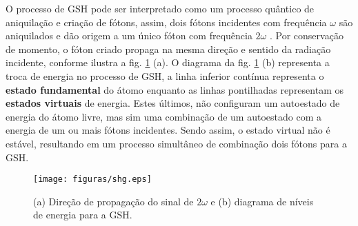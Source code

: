 O processo de GSH pode ser interpretado como um processo quântico de aniquilação e criação de fótons, assim, dois fótons incidentes com frequência $\omega$ são aniquilados e dão origem a um único fóton com frequência $2\omega$ \cite{boyd,zayats}. Por conservação de momento, o fóton criado propaga na mesma direção e sentido da radiação incidente, conforme ilustra a fig. \ref{fig:shg} (a). O diagrama da fig. \ref{fig:shg} (b) representa a troca de energia no processo de GSH, a linha inferior contínua representa o \textbf{estado fundamental} do átomo enquanto as linhas pontilhadas representam os \textbf{estados virtuais} de energia. Estes últimos, não configuram um autoestado de energia do átomo livre, mas sim uma combinação de um autoestado com a energia de um ou mais fótons incidentes. Sendo assim, o estado virtual não é estável, resultando em um processo simultâneo de combinação dois fótons para a GSH.

\begin{figure}[h]
\centering 
\texttt{[image: figuras/shg.eps]}
\caption{(a) Direção de propagação do sinal de $2\omega$ e (b) diagrama de níveis de energia para a GSH. \cite{boyd}}
\label{fig:shg}
\end{figure}
